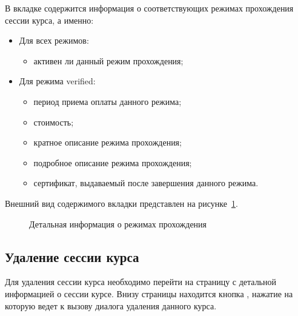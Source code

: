 	В вкладке  содержится информация о соответствующих режимах прохождения сессии курса, а именно:
	\begin{itemize}
		\item Для всех режимов:
		\begin{itemize}
			\item активен ли данный режим прохождения;
		\end{itemize}
		\item Для режима verified:
		\begin{itemize}
		\item период приема оплаты данного режима;
		\item стоимость;
		\item кратное описание режима прохождения;
		\item подробное описание режима прохождения;
		\item сертификат, выдаваемый после завершения данного режима.			
		\end{itemize}
	\end{itemize}
	
	Внешний вид содержимого вкладки  представлен на рисунке~\ref{img:course_session:course_sessions_detail_enroll}.
	
	\begin{figure}[H]
		\caption{Детальная информация о режимах прохождения}
		\label{img:course_session:course_sessions_detail_enroll}
	\end{figure}

\subsection{Удаление сессии курса}
Для удаления сессии курса необходимо перейти на страницу с детальной информацией о сессии курсе.
Внизу страницы находится кнопка , нажатие на которую ведет к вызову диалога удаления данного курса.


